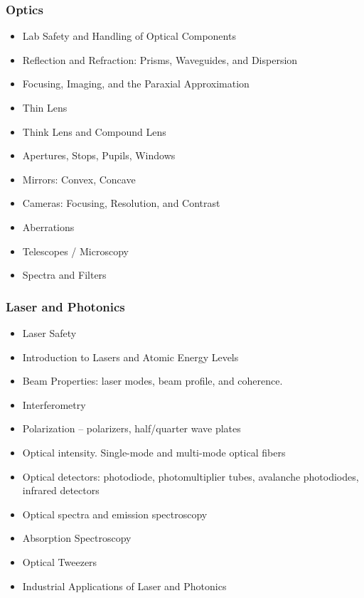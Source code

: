 \documentclass{beamer}
\begin{document}
\begin{frame}\frametitle{Optics}
\begin{itemize}
\item Lab Safety and Handling of Optical Components
\item Reflection and Refraction: Prisms, Waveguides, and Dispersion
\item Focusing, Imaging, and the Paraxial Approximation
\item Thin Lens
\item Think Lens and Compound Lens
\item Apertures, Stops, Pupils, Windows
\item Mirrors: Convex, Concave
\item Cameras: Focusing, Resolution, and Contrast
\item Aberrations
\item Telescopes / Microscopy
\item Spectra and Filters
\end{itemize}
\end{frame}

\begin{frame}\frametitle{Laser and Photonics}
\begin{itemize}
\item Laser  Safety
\item Introduction to Lasers and Atomic Energy Levels
\item Beam Properties: laser modes, beam profile, and coherence.
\item Interferometry
\item Polarization – polarizers, half/quarter wave plates
\item Optical intensity. Single-mode and multi-mode optical fibers
\item Optical detectors: photodiode, photomultiplier tubes, avalanche photodiodes, infrared detectors
\item Optical spectra and emission spectroscopy
\item Absorption Spectroscopy
\item Optical Tweezers
\item Industrial Applications of Laser and Photonics
\end{itemize}
\end{frame}
\end{document}
